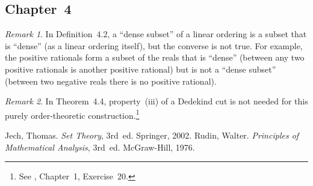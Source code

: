 \documentclass[letterpaper,12pt]{article}
\theoremstyle{definition}
\theoremstyle{remark}
\newtheorem*{rmk}{Remark}
\begin{document}
\subsection*{Chapter~4}
\begin{rmk}
In Definition~4.2, a ``dense subset'' of a linear ordering is a subset that is ``dense'' (as a linear ordering itself), but the converse is not true. For example, the positive rationals form a subset of the reals that is ``dense'' (between any two positive rationals is another positive rational) but is not a ``dense subset'' (between two negative reals there is no positive rational).
\end{rmk}

\begin{rmk}
In Theorem~4.4, property~(iii) of a Dedekind cut is not needed for this purely order-theoretic construction.\footnote{See \cite{rudin}, Chapter~1, Exercise~20.}
\end{rmk}

\begin{thebibliography}{0}
 Jech, Thomas. \textit{Set Theory}, 3rd~ed. Springer, 2002.
 Rudin, Walter. \textit{Principles of Mathematical Analysis}, 3rd~ed. McGraw-Hill, 1976.
\end{thebibliography}
\end{document}
